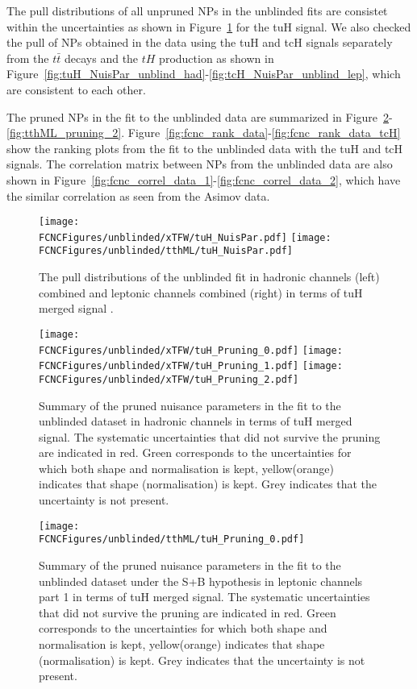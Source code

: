 The pull distributions of all unpruned NPs in the unblinded fits are consistet within the uncertainties as shown in Figure~\ref{fig:fcnc_pull_data}
for the tuH signal.
We also checked the pull of NPs obtained in the data using the tuH and tcH signals separately from the $t\bar t$ decays and the $tH$ production as shown
in Figure~\ref{fig:tuH_NuisPar_unblind_had}-\ref{fig:tcH_NuisPar_unblind_lep}, which are consistent to each other.

The pruned NPs in the fit to the unblinded data are summarized in Figure~\ref{fig:xTFW_pruning_0}-\ref{fig:tthML_pruning_2}.
Figure~\ref{fig:fcnc_rank_data}-\ref{fig:fcnc_rank_data_tcH} show the ranking plots from the fit to the unblinded data with the tuH and tcH signals.
The correlation matrix between NPs from the unblinded data are also shown in Figure~\ref{fig:fcnc_correl_data_1}-\ref{fig:fcnc_correl_data_2}, which have the similar correlation as
seen from the Asimov data. 





\begin{figure}[htb]
\centering
\texttt{[image: \\FCNCFigures/unblinded/xTFW/tuH\_NuisPar.pdf]}
\texttt{[image: \\FCNCFigures/unblinded/tthML/tuH\_NuisPar.pdf]}
\caption{ The pull distributions of the unblinded fit in hadronic channels (left) combined and leptonic channels combined (right) in terms of tuH merged signal . }
\label{fig:fcnc_pull_data}
\end{figure}


\begin{figure}[htb]
\centering
\texttt{[image: \\FCNCFigures/unblinded/xTFW/tuH\_Pruning\_0.pdf]}
\texttt{[image: \\FCNCFigures/unblinded/xTFW/tuH\_Pruning\_1.pdf]}
\texttt{[image: \\FCNCFigures/unblinded/xTFW/tuH\_Pruning\_2.pdf]}
\caption{ Summary of the pruned nuisance parameters in the fit to the unblinded dataset in hadronic channels in terms of tuH merged signal. The systematic uncertainties that did not survive the pruning are indicated in red. Green corresponds to the uncertainties for which both shape and normalisation is kept, yellow(orange) indicates that shape (normalisation) is kept. Grey indicates that the uncertainty is not present.}
\label{fig:xTFW_pruning_0}
\end{figure}


\begin{figure}[htb]
\centering
\texttt{[image: \\FCNCFigures/unblinded/tthML/tuH\_Pruning\_0.pdf]}
\caption{ Summary of the pruned nuisance parameters in the fit to the unblinded dataset under the S+B hypothesis in leptonic channels part 1 in terms of tuH merged signal. The systematic uncertainties that did not survive the pruning are indicated in red. Green corresponds to the uncertainties for which both shape and normalisation is kept, yellow(orange) indicates that shape (normalisation) is kept. Grey indicates that the uncertainty is not present.}
\label{fig:tthML_pruning_0}
\end{figure}

